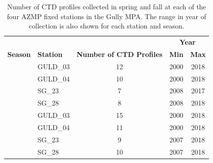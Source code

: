 \documentclass[12pt]{article}\usepackage[]{graphicx}\usepackage[]{color}
\begin{document}
\begin{longtable}[t]{llccc}
\caption{\label{tab:table2}Number of CTD profiles collected in spring and fall at each of the four AZMP fixed stations in the Gully MPA. The range in year of collection is also shown for each station and season.}\\
\toprule
\multicolumn{1}{c}{\bgroup\fontsize{12}{14}\selectfont \textbf{ }\egroup{}} & \multicolumn{1}{c}{\bgroup\fontsize{12}{14}\selectfont \textbf{ }\egroup{}} & \multicolumn{1}{c}{\bgroup\fontsize{12}{14}\selectfont \textbf{ }\egroup{}} & \multicolumn{2}{c}{\bgroup\fontsize{12}{14}\selectfont \textbf{Year}\egroup{}} \\
\cmidrule(l{3pt}r{3pt}){4-5}
\begingroup\fontsize{12}{14}\selectfont \textbf{Season}\endgroup & \begingroup\fontsize{12}{14}\selectfont \textbf{Station}\endgroup & \begingroup\fontsize{12}{14}\selectfont \textbf{Number of CTD Profiles}\endgroup & \begingroup\fontsize{12}{14}\selectfont \textbf{Min}\endgroup & \begingroup\fontsize{12}{14}\selectfont \textbf{Max}\endgroup\\
\midrule
 & GULD\_03 & 12 & 2000 & 2018\\
\nopagebreak
 & GULD\_04 & 10 & 2000 & 2018\\
\nopagebreak
 & SG\_23 & 7 & 2008 & 2017\\
\nopagebreak
\multirow{-4}{*}{\raggedright\arraybackslash Spring} & SG\_28 & 8 & 2008 & 2018\\
\cmidrule{1-5}\pagebreak[0]
 & GULD\_03 & 15 & 2000 & 2018\\
\nopagebreak
 & GULD\_04 & 11 & 2000 & 2018\\
\nopagebreak
 & SG\_23 & 9 & 2007 & 2018\\
\nopagebreak
\multirow{-4}{*}{\raggedright\arraybackslash Fall} & SG\_28 & 10 & 2007 & 2018\\
\bottomrule
\end{longtable}
\clearpage
\end{document}
